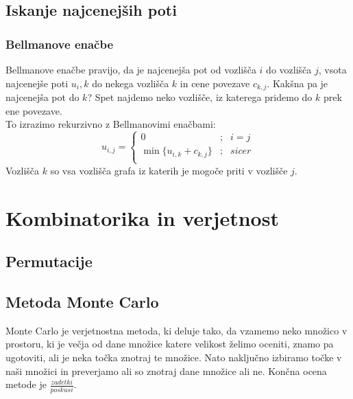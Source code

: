 \documentclass[10pt,a4paper,oneside]{book}
\begin{document}
\section{Iskanje najcenejših poti}
\subsection{Bellmanove enačbe}
Bellmanove enačbe pravijo, da je najcenejša pot od vozlišča $i$ do vozlišča $j$, vsota najcenejše poti $u_i,k$ do nekega vozlišča $k$ in cene povezave $c_{k,j}$. Kakšna pa je najcenejša pot do $k$? Spet najdemo neko vozlišče, iz katerega pridemo do $k$ prek ene povezave.\\
To izrazimo rekurzivno z Bellmanovimi enačbami:
\[	u_{i,j} =
	\left\{
		\begin{matrix}
			0 & ; & i = j\\
			\min \{ u_{i,k} + c_{k,j} \} & ; & sicer\\
		\end{matrix}
	\right. \]
Vozlišča $k$ so vsa vozlišča grafa iz katerih je mogoče priti v vozlišče $j$.

\chapter{Kombinatorika in verjetnost}
\section{Permutacije}


\section{Metoda Monte Carlo}
Monte Carlo je verjetnostna metoda, ki deluje tako, da vzamemo neko množico v prostoru, ki je večja od dane množice katere velikost želimo oceniti, znamo pa ugotoviti, ali je neka točka znotraj te množice. Nato naključno izbiramo točke v naši množici in preverjamo ali so znotraj dane množice ali ne. Končna ocena metode je $\frac{zadetki}{poskusi}$.
\end{document}
